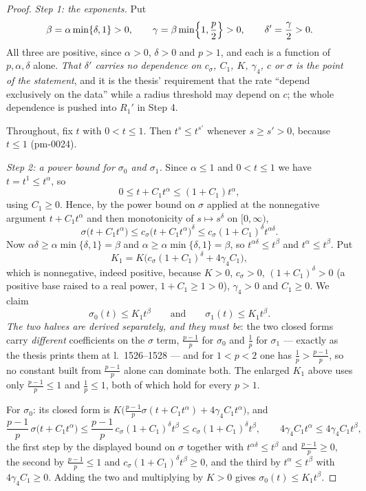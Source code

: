 \begin{proof}
\emph{Step 1: the exponents.}  Put
\[
\beta=\alpha\min\{\delta,1\}>0,
\qquad
\gamma=\beta\min\Bigl\{1,\frac p2\Bigr\}>0,
\qquad
\delta'=\frac\gamma2>0 .
\]
All three are positive, since $\alpha>0$, $\delta>0$ and $p>1$, and each is a
function of $p,\alpha,\delta$ alone.  \emph{That $\delta'$ carries no dependence
on $c_\sigma$, $C_1$, $K$, $\gamma_4$, $c$ or $\sigma$ is the point of the
statement}, and it is the thesis' requirement that the rate ``depend
exclusively on the data'' while a radius threshold may depend on $c$; the whole
dependence is pushed into $R_1'$ in Step 4.

Throughout, fix $t$ with $0<t\le1$.  Then $t^{s}\le t^{s'}$ whenever
$s\ge s'>0$, because $t\le1$ (pm-0024).

\emph{Step 2: a power bound for $\sigma_0$ and $\sigma_1$.}  Since $\alpha\le1$
and $0<t\le1$ we have $t=t^1\le t^{\alpha}$, so
\[
0\le t+C_1t^{\alpha}\le(1+C_1)t^{\alpha},
\]
using $C_1\ge0$.  Hence, by the power bound on $\sigma$ applied at the
nonnegative argument $t+C_1t^{\alpha}$ and then monotonicity of $s\mapsto
s^{\delta}$ on $[0,\infty)$,
\[
\sigma\bigl(t+C_1t^{\alpha}\bigr)\le c_\sigma\bigl(t+C_1t^{\alpha}\bigr)^{\delta}
\le c_\sigma(1+C_1)^{\delta}t^{\alpha\delta}.
\]
Now $\alpha\delta\ge\alpha\min\{\delta,1\}=\beta$ and
$\alpha\ge\alpha\min\{\delta,1\}=\beta$, so $t^{\alpha\delta}\le t^{\beta}$ and
$t^{\alpha}\le t^{\beta}$.  Put
\[
K_1=K\bigl(c_\sigma(1+C_1)^{\delta}+4\gamma_4C_1\bigr),
\]
which is nonnegative, indeed positive, because $K>0$, $c_\sigma>0$,
$(1+C_1)^{\delta}>0$ (a positive base raised to a real power, $1+C_1\ge1>0$),
$\gamma_4>0$ and $C_1\ge0$.  We claim
\[
\sigma_0(t)\le K_1t^{\beta}
\qquad\text{and}\qquad
\sigma_1(t)\le K_1t^{\beta} .
\tag{1}
\]
\emph{The two halves are derived separately, and they must be}: the two closed
forms carry \emph{different} coefficients on the $\sigma$ term, $\frac{p-1}p$
for $\sigma_0$ and $\frac1p$ for $\sigma_1$ --- exactly as the thesis prints
them at l.~1526--1528 --- and for $1<p<2$ one has $\frac1p>\frac{p-1}p$, so no
constant built from $\frac{p-1}p$ alone can dominate both.  The enlarged $K_1$
above uses only $\frac{p-1}p\le1$ and $\frac1p\le1$, both of which hold for
every $p>1$.

For $\sigma_0$: its closed form is
$K\bigl(\frac{p-1}p\sigma(t+C_1t^{\alpha})+4\gamma_4C_1t^{\alpha}\bigr)$, and
\[
\frac{p-1}p\,\sigma\bigl(t+C_1t^{\alpha}\bigr)
\le\frac{p-1}p\,c_\sigma(1+C_1)^{\delta}t^{\beta}
\le c_\sigma(1+C_1)^{\delta}t^{\beta},
\qquad
4\gamma_4C_1t^{\alpha}\le4\gamma_4C_1t^{\beta},
\]
the first step by the displayed bound on $\sigma$ together with
$t^{\alpha\delta}\le t^{\beta}$ and $\frac{p-1}p\ge0$, the second by
$\frac{p-1}p\le1$ and $c_\sigma(1+C_1)^{\delta}t^{\beta}\ge0$, and the third by
$t^{\alpha}\le t^{\beta}$ with $4\gamma_4C_1\ge0$.  Adding the two and
multiplying by $K>0$ gives $\sigma_0(t)\le K_1t^{\beta}$.


\end{proof}
